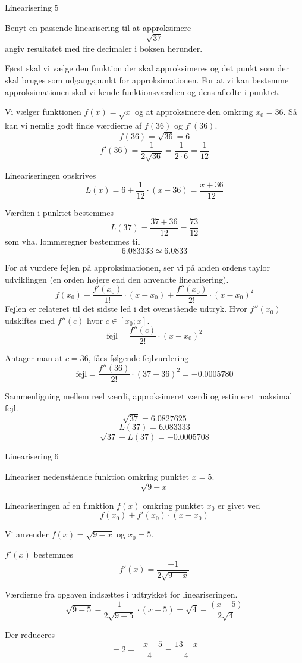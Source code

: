 \documentclass{article}
\begin{document}
\begin{exercise}{Linearisering 5}

Benyt en passende linearisering til at approksimere
\[
\sqrt{37}
\]
angiv resultatet med fire decimaler i boksen herunder.

\hint
Først skal vi vælge den funktion der skal approksimeres
og det punkt som der skal bruges som udgangspunkt for
approksimationen.
For at vi kan bestemme approksimationen skal vi
kende funktionsværdien og dens afledte i punktet.

\hint
Vi vælger funktionen $f(x) = \sqrt{x}$ og at approksimere den
omkring $x_0 = 36$.
Så kan vi nemlig godt finde værdierne af $f(36)$ og $f'(36)$.
\[
f(36) = \sqrt{36} = 6
\]
\[
f'(36) = \frac{1}{2 \sqrt{36}} = \frac{1}{2 \cdot 6 } = \frac{1}{12}
\]

\hint
Lineariseringen opskrives
\[
L(x) = 6 + \frac{1}{12} \cdot (x - 36) = \frac{x + 36}{12}
\]

\hint
Værdien i punktet bestemmes
\[
L(37) = \frac{37 + 36}{12} = \frac{73}{12}
\]
som vha. lommeregner bestemmes til
\[
6.083333 \simeq 6.0833
\]

\hint

For at vurdere fejlen på approksimationen, ser vi på anden
ordens taylor udviklingen (en orden højere end den
anvendte linearisering).
\[
f(x_0)
+ \frac{f'(x_0)}{1!} \cdot (x - x_0)
+ \frac{f''(x_0)}{2!} \cdot (x - x_0)^2
\]
Fejlen er relateret til det sidste led i det ovenstående udtryk.
Hvor $f''(x_0)$ udskiftes med $f''(c)$ hvor $c \in [x_0; x]$.
\[
\textrm{fejl} = \frac{f''(c)}{2!} \cdot (x - x_0)^2
\]

\hint
Antager man at $c = 36$, fåes følgende fejlvurdering
\[
\textrm{fejl} = \frac{f''(36)}{2!} \cdot (37 - 36)^2 =
-0.0005780
\]

\hint
Sammenligning mellem reel værdi, approksimeret værdi og estimeret maksimal fejl.
\[
\sqrt{37}= 6.0827625
\]
\[
L(37) = 6.083333
\]
\[
\sqrt{37} - L(37) = -0.0005708
\]

\end{exercise}

\begin{exercise}{Linearisering 6}

Lineariser nedenstående funktion omkring punktet $x = 5$.
\[
\sqrt{9 - x}
\]


\hint
Lineariseringen af en funktion $f(x)$
omkring punktet $x_0$ er givet ved
\[
f(x_0) + f'(x_0) \cdot (x - x_0)
\]

\hint
Vi anvender $f(x) = \sqrt{9 - x}$ og $x_0 = 5$.

\hint
$f'(x)$ bestemmes
\[
f'(x) = \frac{-1}{2 \sqrt{9 - x}}
\]

\hint
Værdierne fra opgaven indsættes i udtrykket for lineariseringen.
\[
\sqrt{9 - 5} - \frac{1}{2 \sqrt{9 - 5}} \cdot (x - 5) = \sqrt{4} - \frac{(x - 5)}{2 \sqrt{4}}
\]

\hint
Der reduceres
\[
= 2 + \frac{-x + 5}{4} = \frac{13 - x}{4}
\]

\end{exercise}
\end{document}
